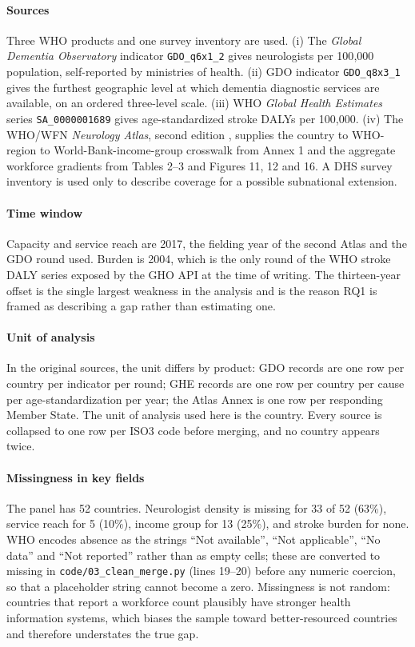 \documentclass[9pt,twoside]{pnas-new}
\begin{document}
\paragraph{Sources} Three WHO products and one survey inventory are used.
(i) The \emph{Global Dementia Observatory} \cite{gdo2017} indicator
\texttt{GDO\_q6x1\_2} gives neurologists per 100{,}000 population, self-reported
by ministries of health.
(ii) GDO indicator \texttt{GDO\_q8x3\_1} gives the furthest geographic level at
which dementia diagnostic services are available, on an ordered three-level
scale. (iii) WHO \emph{Global Health Estimates} series \texttt{SA\_0000001689}
\cite{ghe2004} gives age-standardized stroke DALYs per 100{,}000.
(iv) The WHO/WFN \emph{Neurology Atlas}, second edition \cite{atlas2017},
supplies the country to
WHO-region to World-Bank-income-group crosswalk from Annex 1 and the aggregate
workforce gradients from Tables 2--3 and Figures 11, 12 and 16. A DHS survey
inventory is used only to describe coverage for a possible subnational
extension.

\paragraph{Time window} Capacity and service reach are 2017, the fielding year
of the second Atlas and the GDO round used. Burden is 2004, which is
the only round of the WHO stroke DALY series exposed by the GHO API at the time
of writing. The thirteen-year offset is the single largest weakness in the
analysis and is the reason RQ1 is framed as describing a gap rather than
estimating one.

\paragraph{Unit of analysis} In the original sources, the unit differs by
product: GDO records are one row per country per indicator per round; GHE records
are one row per country per cause per age-standardization per year; the Atlas
Annex is one row per responding Member State. The unit of analysis
used here is the country. Every source is collapsed to one row
per ISO3 code before merging, and no country appears twice.

\paragraph{Missingness in key fields} The panel has 52 countries.
Neurologist density is missing for 33 of 52 (63\%), service reach for
5 (10\%), income group for 13 (25\%), and stroke burden for none. WHO encodes
absence as the strings ``Not available'', ``Not applicable'', ``No data'' and
``Not reported'' rather than as empty cells; these are converted to missing in
\texttt{code/03\_clean\_merge.py} (lines 19--20) before any numeric coercion, so
that a placeholder string cannot become a zero. Missingness is not
random: countries that report a workforce count plausibly have stronger health
information systems, which biases the sample toward better-resourced countries
and therefore understates the true gap.
\end{document}
